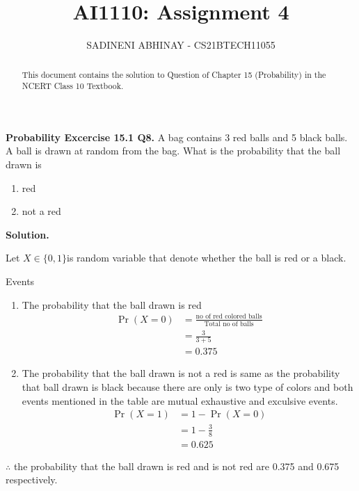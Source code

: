 \documentclass[journal,12pt,twocolumn]{IEEEtran}
\title{
	AI1110: Assignment 4
}
\author{ 
	SADINENI ABHINAY - CS21BTECH11055
}
\providecommand{\pr}[1]{\ensuremath{\Pr\left(#1\right)}}
\begin{document}
	\maketitle
	\begin{abstract}
		This document contains the solution to Question of Chapter 15 (Probability) in the NCERT Class 10 Textbook.
	\end{abstract}
	
	\textbf{Probability Excercise 15.1 Q8.}
	A bag contains 3 red balls and 5 black balls. A ball is drawn at random from the bag. What is the probability that the ball drawn is 
	\begin{enumerate}
		\item red
		\item not a red
	\end{enumerate}
	
	\textbf{Solution.}
	
	Let $X \in \{0,1\} $is random variable that denote whether the ball is red or a black.
	\begin{table}[ht!]
	\centering
	
	\caption{Events}
	\label{table:1}
	\end{table}
	\begin{enumerate}
	\item The probability that the ball drawn is red 
	   \begin{align}
	   	\pr{X=0}&=\frac{\text{no of red colored balls}}{\text{Total no of balls}}\\
	   	        &=\frac{3}{3+5}\\
	   	        &=0.375
	   \end{align}
	\item The probability that the ball drawn is not a red is same as
	the probability that ball drawn is black because there are only is
	two type of colors and both events mentioned in the table are mutual exhaustive and exculsive events.
	\begin{align}
		\pr{X=1}&=1-\pr{X=0}\\
		&=1-\frac{3}{8}\\
		&=0.625
	\end{align}
\end{enumerate}
$\therefore$ the probability that the ball drawn is red and is not red are 0.375 and 0.675 respectively.
\end{document}
